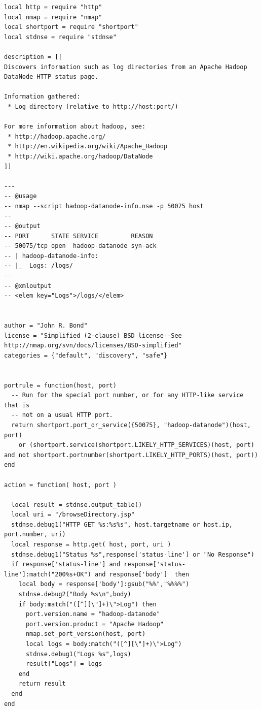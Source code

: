 \documentclass[10pt,a4paper]{article}
\begin{document}
\begin{lstlisting}
local http = require "http"
local nmap = require "nmap"
local shortport = require "shortport"
local stdnse = require "stdnse"

description = [[
Discovers information such as log directories from an Apache Hadoop DataNode HTTP status page.

Information gathered:
 * Log directory (relative to http://host:port/)

For more information about hadoop, see:
 * http://hadoop.apache.org/
 * http://en.wikipedia.org/wiki/Apache_Hadoop
 * http://wiki.apache.org/hadoop/DataNode
]]

---
-- @usage
-- nmap --script hadoop-datanode-info.nse -p 50075 host
--
-- @output
-- PORT      STATE SERVICE         REASON
-- 50075/tcp open  hadoop-datanode syn-ack
-- | hadoop-datanode-info:
-- |_  Logs: /logs/
--
-- @xmloutput
-- <elem key="Logs">/logs/</elem>


author = "John R. Bond"
license = "Simplified (2-clause) BSD license--See http://nmap.org/svn/docs/licenses/BSD-simplified"
categories = {"default", "discovery", "safe"}


portrule = function(host, port)
  -- Run for the special port number, or for any HTTP-like service that is
  -- not on a usual HTTP port.
  return shortport.port_or_service({50075}, "hadoop-datanode")(host, port)
    or (shortport.service(shortport.LIKELY_HTTP_SERVICES)(host, port) and not shortport.portnumber(shortport.LIKELY_HTTP_PORTS)(host, port))
end

action = function( host, port )

  local result = stdnse.output_table()
  local uri = "/browseDirectory.jsp"
  stdnse.debug1("HTTP GET %s:%s%s", host.targetname or host.ip, port.number, uri)
  local response = http.get( host, port, uri )
  stdnse.debug1("Status %s",response['status-line'] or "No Response")
  if response['status-line'] and response['status-line']:match("200%s+OK") and response['body']  then
    local body = response['body']:gsub("%%","%%%%")
    stdnse.debug2("Body %s\n",body)
    if body:match("([^][\"]+)\">Log") then
      port.version.name = "hadoop-datanode"
      port.version.product = "Apache Hadoop"
      nmap.set_port_version(host, port)
      local logs = body:match("([^][\"]+)\">Log")
      stdnse.debug1("Logs %s",logs)
      result["Logs"] = logs
    end
    return result
  end
end
\end{lstlisting}
\end{document}
